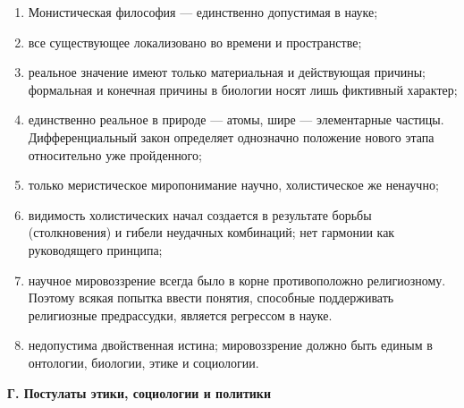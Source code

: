 \begin{enumerate}

  \item Монистическая философия --- единственно допустимая в
        науке;

  \item все существующее локализовано во времени и пространстве;

  \item реальное значение имеют только материальная и действующая
        причины; формальная и конечная причины в биологии носят лишь
        фиктивный характер;

  \item единственно реальное в природе --- атомы, шире ---
        элементарные частицы. Дифференциальный закон определяет
        однозначно положение нового этапа относительно уже
        пройденного;

  \item только меристическое миропонимание научно, холистическое же
        ненаучно;

  \item видимость холистических начал создается в результате борьбы
        (столкновения) и гибели неудачных комбинаций; нет гармонии
        как руководящего принципа;

  \item научное мировоззрение всегда было в корне противоположно
        религиозному. Поэтому всякая попытка ввести понятия,
        способные поддерживать религиозные предрассудки, является
        регрессом в науке.

  \item недопустима двойственная истина; мировоззрение должно быть
        единым в онтологии, биологии, этике и социологии.

\end{enumerate}

\begin{center}

  \textbf{Г. Постулаты этики, социологии и политики}

\end{center}

